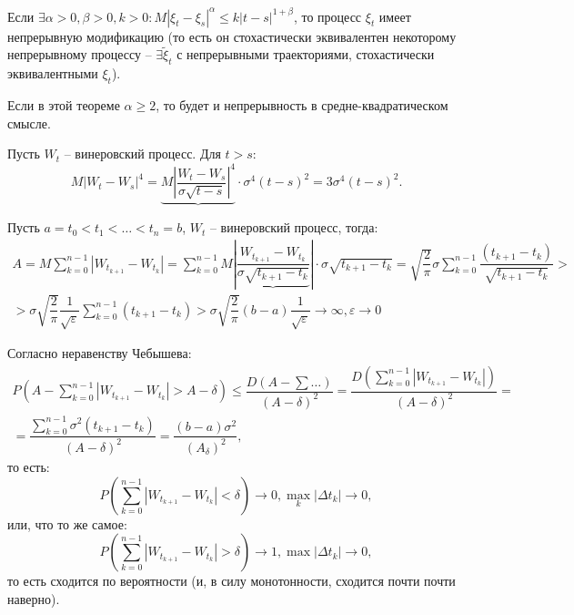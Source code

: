 \begin{theorem}[Колмогорова]
  Если $\exists \alpha > 0, \beta > 0, k>0 : M|\xi_t - \xi_s|^\alpha \leqslant k |t-s|^{1+\beta}$,
  то процесс $\xi_t$ имеет непрерывную модификацию (то есть он стохастически эквивалентен
  некоторому непрерывному процессу -- $\exists \tilde \xi_t$ с непрерывными траекториями,
  стохастически эквивалентными $\xi_t$).
\end{theorem}

Если в этой теореме $\alpha \geqslant 2$, то будет и непрерывность в средне-квадратическом смысле.

\begin{ex}
  Пусть $W_t$ -- винеровский процесс. Для $t > s$:
  \[
    M|W_t - W_s|^4 = \underbrace{M \left| \dfrac{W_t - W_s}{\sigma \sqrt{t-s}} \right|^4} \cdot \sigma^4 (t-s)^2
    = 3 \sigma^4 (t-s)^2.
  \]
\end{ex}

Пусть $a=t_0 < t_1 < \dots < t_{n} = b$, $W_t$ -- винеровский процесс, тогда:
\begin{multline*}
  A = M\sum_{k=0}^{n-1} |W_{t_{k+1}} - W_{t_k}|
  = \sum_{k=0}^{n-1} M \left| \underbrace{\dfrac{W_{t_{k+1}} - W_{t_k}}{\sigma \sqrt{t_{k+1} - t_k}}} \right|
  \cdot \sigma \sqrt{t_{k+1} - t_{k}}
  = \sqrt{\dfrac{2}{\pi}} \sigma \sum_{k=0}^{n-1} \dfrac{(t_{k+1} - t_k)}{\sqrt{t_{k+1} - t_k}} > \\
  > \sigma \sqrt{\dfrac{2}{\pi}} \dfrac{1}{\sqrt{\varepsilon}} \sum_{k=0}^{n-1} (t_{k+1} - t_k)
  > \sigma \sqrt{\dfrac{2}{\pi}} (b-a) \dfrac{1}{\sqrt{\varepsilon}} \to \infty, \varepsilon \to 0
\end{multline*}

Согласно неравенству Чебышева:
\begin{multline*}
  P\left(A - \sum_{k=0}^{n-1} |W_{t_{k+1}} - W_{t_k}| > A - \delta\right)
  \leqslant \dfrac{D(A - \sum\dots)}{(A-\delta)^2}
  = \dfrac{D \left( \sum_{k=0}^{n-1} |W_{t_{k+1}} - W_{t_k}| \right) }{(A-\delta)^2} = \\
  = \dfrac{\sum_{k=0}^{n-1} \sigma^2 (t_{k+1} - t_k)}{(A-\delta)^2}
  = \dfrac{(b-a) \sigma^2 }{(A_\delta)^2},
\end{multline*}
то есть:
\[
  P \left( \sum_{k=0}^{n-1} |W_{t_{k+1}} - W_{t_k}| < \delta \right)  \to 0, \max_k |\Delta t_k| \to 0,
\]
или, что то же самое:
\[
  P \left( \sum_{k=0}^{n-1} |W_{t_{k+1}} - W_{t_k}| > \delta \right) \to 1, 
  \max |\Delta t_k| \to 0,
\]
то есть сходится по вероятности (и, в силу монотонности, сходится почти почти наверно).


